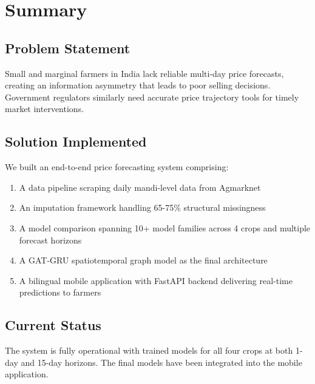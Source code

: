 \documentclass[12pt]{article}
\begin{document}
\section{Summary}

\subsection{Problem Statement}

Small and marginal farmers in India lack reliable multi-day price forecasts, creating an information asymmetry that leads to poor selling decisions. Government regulators similarly need accurate price trajectory tools for timely market interventions.

\subsection{Solution Implemented}

We built an end-to-end price forecasting system comprising:

\begin{enumerate}
\item A data pipeline scraping daily mandi-level data from Agmarknet
\item An imputation framework handling 65-75\% structural missingness
\item A model comparison spanning 10+ model families across 4 crops and multiple forecast horizons
\item A GAT-GRU spatiotemporal graph model as the final architecture
\item A bilingual mobile application with FastAPI backend delivering real-time predictions to farmers
\end{enumerate}

\subsection{Current Status}

The system is fully operational with trained models for all four crops at both 1-day and 15-day horizons. The final models have been integrated into the mobile application.
\end{document}
